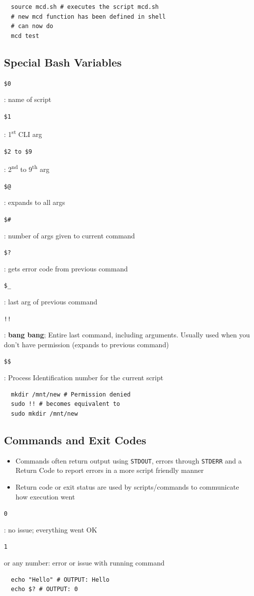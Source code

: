 \documentclass[letterpaper,12pt]{article}
\newcommand*{\lstitem}[1]{
  \setbox0\hbox{\lstinline{#1}}
  \item[\usebox0]
}
\begin{document}
\begin{lstlisting}
  source mcd.sh # executes the script mcd.sh
  # new mcd function has been defined in shell
  # can now do
  mcd test
\end{lstlisting}

\subsection{Special Bash Variables}
\begin{description}
 \lstitem{$0}: name of script
 \lstitem{$1}: 1\textsuperscript{st} CLI arg
 \lstitem{$2 to $9}: 2\textsuperscript{nd} to 9\textsuperscript{th} arg
 \lstitem{$@}: expands to all args
 \lstitem{$#}: number of args given to current command
 \lstitem{$?}: gets error code from previous command
 \lstitem{$_}: last arg of previous command
 \lstitem{!!}: \textbf{bang bang}; Entire last command, including arguments. Usually used when you don't have permission (expands to previous command)
 \lstitem{$$}: Process Identification number for the current script
\end{description}

\begin{lstlisting}
  mkdir /mnt/new # Permission denied
  sudo !! # becomes equivalent to
  sudo mkdir /mnt/new
\end{lstlisting}

\subsection{Commands and Exit Codes}

\begin{itemize}
 \item Commands often return output using \lstinline{STDOUT}, errors through \lstinline{STDERR} and a Return Code to report errors in a more script friendly manner
 \item Return code or exit status are used by scripts/commands to communicate how execution went
\end{itemize}

\begin{description}
 \lstitem{0}: no issue; everything went OK
 \lstitem{1} or any number: error or issue with running command
\end{description}

\begin{lstlisting}
  echo "Hello" # OUTPUT: Hello
  echo $? # OUTPUT: 0
\end{lstlisting}
\end{document}
